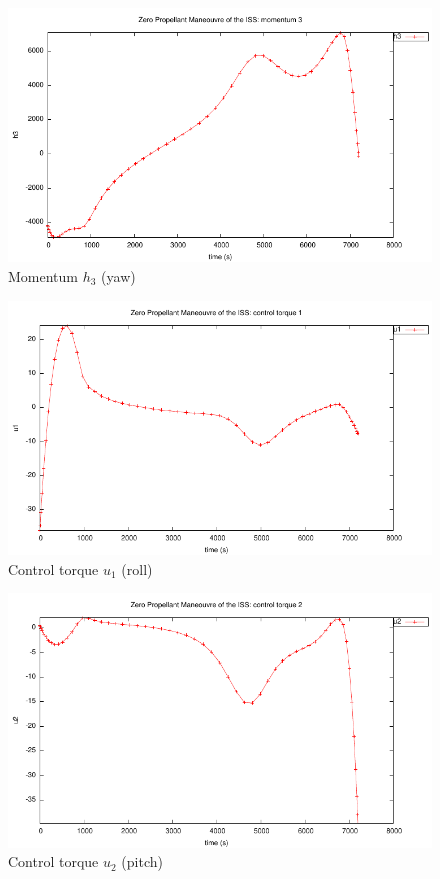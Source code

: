 \documentclass[a4paper,11pt]{report}    %
\begin{document}
\begin{figure}
  \centering
  \includegraphics{../examples/zpm/zpm_h3}
  \caption{Momentum $h_3$ (yaw) }
 \label{fig:zpm_h3}
\end{figure}


\begin{figure}
  \centering
  \includegraphics{../examples/zpm/zpm_u1}
  \caption{Control torque $u_1$ (roll)}
 \label{fig:zpm_u1}
\end{figure}

\begin{figure}
  \centering
  \includegraphics{../examples/zpm/zpm_u2}
  \caption{Control torque $u_2$ (pitch)}
 \label{fig:zpm_u2}
\end{figure}
\end{document}
